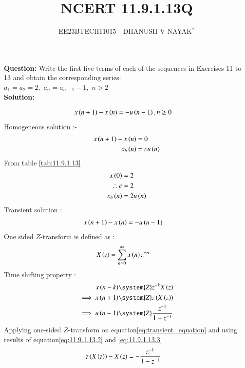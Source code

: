 \documentclass[journal,12pt,twocolumn]{IEEEtran}
\theoremstyle{remark}
\begin{document}

\title{NCERT 11.9.1.13Q}
\author{EE23BTECH11015 - DHANUSH V NAYAK$^{*}$%
}
\maketitle
\newpage
\bigskip
\renewcommand{\thefigure}{\arabic{figure}}
\renewcommand{\thetable}{\theenumi}
\textbf{Question:} Write the first five terms of each of the sequences in Exercises 11 to 13 and obtain the corresponding series:\\
$a_1=a_2=2,$\hspace{5pt} $a_n=a_{n-1} -1,$\hspace{5pt} $n>2$\\
\textbf{Solution:}

\begin{align}
    x\left(n+1\right) - x\left(n\right) &= -u\left(n-1\right) , n\geq 0 \label{eq:11.9.1.13.1}
\end{align}
Homogeneous solution :-
\begin{align}
    x\left(n+1\right) - x\left(n\right) &= 0\\
    x_h\left(n\right) &= cu\left(n\right)
\end{align}
From table \ref{tab:11.9.1.13}
\begin{align}
    x\left(0\right) &= 2\\
    \therefore c&=2\\
    x_h\left(n\right) &= 2u\left(n\right)
\end{align}
Transient solution :
\begin{align}
     x\left(n+1\right) - x\left(n\right) &= -u\left(n-1\right) \label{eq:transient_equation}
\end{align}
One sided $Z$-transform is defined as :
\begin{align}
    X\left(z\right) &= \sum_{n=0}^\infty x\left(n\right) z^{-n}
\end{align}
Time shifting property :
\begin{align}
	x\brak{n-k}&\system{Z} z^{-k}X\brak{z}\label{eq:shiftk}\\
\implies x\brak{n+1} &\system{Z} z\brak{X\brak{z}} \label{eq:11.9.1.13.2} \\
\implies u\brak{n-1} &\system{Z} \frac{z^{-1}}{1-z^{-1}} \label{eq:11.9.1.13.3}
\end{align}
Applying one-sided $Z$-transform on equation\eqref{eq:transient_equation} and using results of equation\eqref{eq:11.9.1.13.2} and \eqref{eq:11.9.1.13.3}
\begin{align}
    z\left(X\left(z\right)\right)- X\left(z\right) &= -\frac{z^{-1}}{1-z^{-1}}
\end{align}
\end{document}
